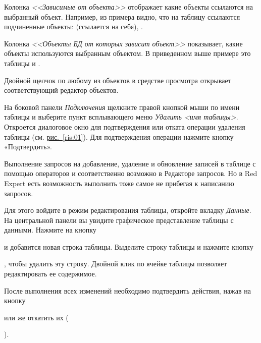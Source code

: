 Колонка \textit{<<Зависимые от объекта>>} отображает какие объекты ссылаются на выбранный объект. Например, из примера видно, что на таблицу  ссылаются подчиненные объекты:  (ссылается на себя), .


Колонка \textit{<<Объекты БД от которых зависит объект>>} показывает, какие объекты используются выбранным объектом. В приведенном выше примере это таблицы  и .

Двойной щелчок по любому из объектов в средстве просмотра открывает соответствующий редактор объектов.

На боковой панели \textit{Подключения} щелкните правой кнопкой мыши по имени таблицы и выберите пункт всплывающего меню \textit{Удалить <имя таблицы>}. Откроется  диалоговое окно для подтверждения или отката операции удаления таблицы (см. \hyperref[ris:01]{рис.~\ref{ris:01}}). Для подтверждения операции нажмите кнопку «Подтвердить».

Выполнение запросов на добавление, удаление и обновление записей в таблице с помощью операторов  и  соответственно возможно в Редакторе запросов. Но в Red Expert есть возможность выполнить тоже самое не прибегая к написанию запросов.

Для этого войдите в режим редактирования таблицы, откройте вкладку \textit{Данные}. На центральной панели вы увидите графическое представление таблицы с данными. Нажмите на кнопку  и добавится новая строка таблицы. Выделите строку таблицы и нажмите кнопку , чтобы удалить эту строку. Двойной клик по ячейке таблицы позволяет редактировать ее содержимое. 

После выполнения всех изменений необходимо подтвердить действия, нажав на кнопку  или же откатить их ().

